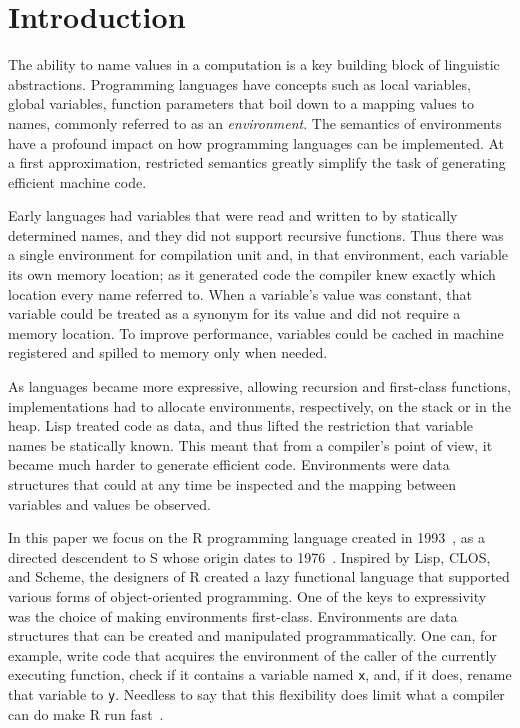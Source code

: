 \documentclass[10pt,review,sigplan,anonymous=true,authorversion=true,nonacm=true]{acmart}
\renewcommand{\c}[1]{\lstinline |#1|\xspace}
\begin{document}

\maketitle
\section{Introduction}

The ability to name values in a computation is a key building block of
linguistic abstractions. Programming languages have concepts such as local
variables, global variables, function parameters that boil down to a mapping
values to names, commonly referred to as an \emph{environment}. The semantics of
environments have a profound impact on how programming languages can be
implemented. At a first approximation, restricted semantics greatly simplify the
task of generating efficient machine code.

Early languages had variables that were read and written to by statically
determined names, and they did not support recursive functions. Thus there was a
single environment for compilation unit and, in that environment, each variable
its own memory location; as it generated code the compiler knew exactly which
location every name referred to. When a variable's value was constant, that
variable could be treated as a synonym for its value and did not require a
memory location. To improve performance, variables could be cached in machine
registered and spilled to memory only when needed.

As languages became more expressive, allowing recursion and first-class
functions, implementations had to allocate environments, respectively, on the
stack or in the heap. Lisp treated code as data, and thus lifted the restriction
that variable names be statically known. This meant that from a compiler's point
of view, it became much harder to generate efficient code. Environments were
data structures that could at any time be inspected and the mapping between
variables and values be observed.

In this paper we focus on the R programming language created in 1993~\cite{r96}, as
a directed descendent to S whose origin dates to 1976~\cite{s88}. Inspired by Lisp,
CLOS, and Scheme, the designers of R created a lazy functional language that
supported various forms of object-oriented programming. One of the keys to
expressivity was the choice of making environments first-class. Environments are
data structures that can be created and manipulated programmatically. One can,
for example, write code that acquires the environment of the caller of the
currently executing function, check if it contains a variable named \c{x}, and,
if it does, rename that variable to \c{y}. Needless to say that this flexibility
does limit what a compiler can do make R run fast~\cite{dls19}.
\end{document}
